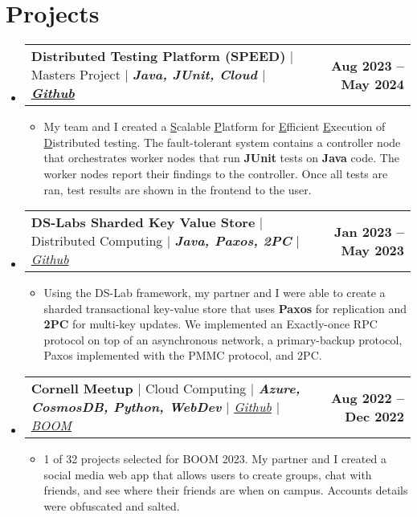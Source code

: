 \documentclass[letterpaper,11pt]{article}
\makeatletter
\newcommand{\resumeItem}[1]{
  \item\small{
    {#1 \vspace{-2pt}}
  }
}
\newcommand{\resumeProjectHeading}[2]{
    \item
    \begin{tabular*}{1.001\textwidth}{l@{\extracolsep{\fill}}r}
      \small#1 & \textbf{\small #2}\\
    \end{tabular*}\vspace{-7pt}
}
\newcommand{\resumeSubHeadingListStart}{\begin{itemize}[leftmargin=0.0in, label={}]}
\newcommand{\resumeSubHeadingListEnd}{\end{itemize}}
\newcommand{\resumeItemListStart}{\begin{itemize}}
\newcommand{\resumeItemListEnd}{\end{itemize}\vspace{-5pt}}
\makeatother
\begin{document}
\section{Projects}
    \vspace{-6pt}
    \resumeSubHeadingListStart
    \resumeProjectHeading
          {\textbf{Distributed Testing Platform (SPEED)} $|$ Masters Project $|$ \textbf{\emph{Java, JUnit, Cloud}\emph{ $|$
          \href{https://github.com/MitchellGray100/SPEED}{Github}}}}{Aug 2023 -- May 2024}
          \resumeItemListStart
            \resumeItem{My team and I created a \underline{S}calable \underline{P}latform for \underline{E}fficient \underline{E}xecution of
            \underline{D}istributed testing. The fault-tolerant system contains a controller node that orchestrates worker nodes that 
            run \textbf{JUnit} tests on \textbf{Java} code. The worker nodes report their findings to the controller. Once all tests are ran, test results are
            shown in the frontend to the user.
            }
          \resumeItemListEnd
          \vspace{-14pt}
    \resumeProjectHeading
          {\textbf{DS-Labs Sharded Key Value Store} $|$ Distributed Computing $|$ \textbf{\emph{Java, Paxos, 2PC}}\emph{ $|$
          \href{https://github.com/emichael/dslabs}{Github}}}{Jan 2023 -- May 2023}
          \resumeItemListStart
            \resumeItem{Using the DS-Lab framework, my partner and I were able to create a sharded transactional key-value 
            store that uses \textbf{Paxos} for replication and \textbf{2PC} for multi-key updates. We implemented
            an Exactly-once RPC protocol on top of an asynchronous network, a primary-backup protocol, 
            Paxos implemented with the PMMC protocol, and 2PC.}
          \resumeItemListEnd
          \vspace{-14pt}
    \resumeProjectHeading
          {\textbf{Cornell Meetup} $|$ Cloud Computing $|$ \textbf{\emph{Azure, CosmosDB, Python, WebDev}}\emph{ $|$
          \href{https://github.com/MitchellGray100/CornellMeetUp}{Github}
          $|$ \href{https://cis.cornell.edu/about/outreach-events/boom-bits-our-minds/projects/boom-2023-projects}
          {BOOM}}}{Aug 2022 -- Dec 2022}
          \resumeItemListStart
            \resumeItem{1 of 32 projects selected for BOOM 2023. My partner and I created a 
            social media web app that allows users to create groups, chat with friends,
            and see where their friends are when on campus. Accounts details were obfuscated and salted.}
          \resumeItemListEnd
          \vspace{-14pt}
    \resumeSubHeadingListEnd
\vspace{-3pt}
\end{document}

